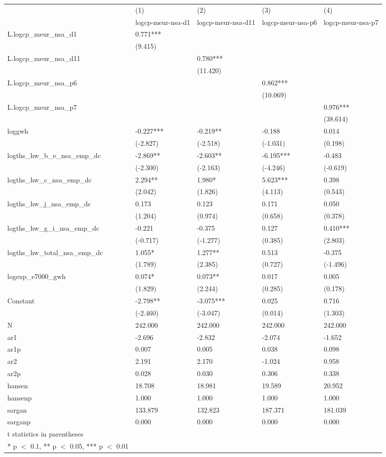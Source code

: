 \begin{tabular}{ p{5.2cm} p{2cm} p{2cm} p{2cm} p{2cm} }

  \hline
   &(1)&(2)&(3)&(4)\\
   &\footnotesize{logcp-meur-nsa-d1}&\footnotesize{logcp-meur-nsa-d11}&\footnotesize{logcp-meur-nsa-p6}&\footnotesize{logcp-meur-nsa-p7}\\
 \hline
L.logcp\_meur\_nsa\_d1&0.771***& & & \\	
 &(9.415)& & & \\		
L.logcp\_meur\_nsa\_d11& &0.780***& & \\	
 & &(11.420)& & \\	
L.logcp\_meur\_nsa\_p6& & &0.862***& \\
 & & &(10.069)& \\
L.logcp\_meur\_nsa\_p7& & & &0.976***\\
 & & & &(38.614)\\
loggwh&-0.227***&-0.219**&-0.188&0.014\\
 &(-2.827)&(-2.518)&(-1.031)&(0.198)\\
logths\_hw\_b\_e\_nsa\_emp\_dc&-2.869**&-2.603**&-6.195***&-0.483\\
 &(-2.300)&(-2.163)&(-4.246)&(-0.619)\\
logths\_hw\_c\_nsa\_emp\_dc&2.294**&1.980*&5.623***&0.398\\
 &(2.042)&(1.826)&(4.113)&(0.543)\\
logths\_hw\_j\_nsa\_emp\_dc&0.173&0.123&0.171&0.050\\
 &(1.204)&(0.974)&(0.658)&(0.378)\\
logths\_hw\_g\_i\_nsa\_emp\_dc&-0.221&-0.375&0.127&0.410***\\
 &(-0.717)&(-1.277)&(0.385)&(2.803)\\
logths\_hw\_total\_nsa\_emp\_dc&1.055*&1.277**&0.513&-0.375\\
 &(1.789)&(2.385)&(0.727)&(-1.496)\\
logexp\_e7000\_gwh&0.074*&0.073**&0.017&0.005\\
 &(1.829)&(2.244)&(0.285)&(0.178)\\
Constant&-2.798**&-3.075***&0.025&0.716\\
 &(-2.460)&(-3.047)&(0.014)&(1.303)\\
 \hline
N&242.000&242.000&242.000&242.000\\
ar1&-2.696&-2.832&-2.074&-1.652\\
ar1p&0.007&0.005&0.038&0.098\\
ar2&2.191&2.170&-1.024&0.958\\
ar2p&0.028&0.030&0.306&0.338\\
hansen&18.708&18.981&19.589&20.952\\
hansenp&1.000&1.000&1.000&1.000\\
sargan&133.879&132.823&187.371&181.039\\
sarganp&0.000&0.000&0.000&0.000\\
 \hline
 t statistics in parentheses\\
\multicolumn{1}{c}{* p $<$ 0.1, ** p $<$ 0.05, *** p $<$ 0.01} \\
\end{tabular}